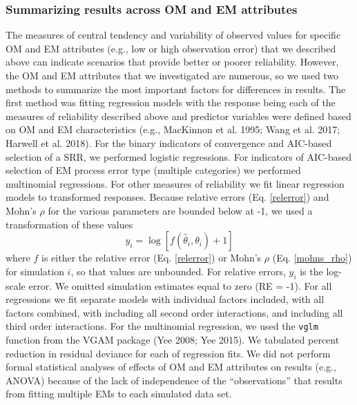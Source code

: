 \documentclass[
  12pt,
]{article}
\begin{document}
\subsubsection*{Summarizing results across OM and EM
attributes}\label{summarizing-results-across-om-and-em-attributes}

The measures of central tendency and variability of observed values for
specific OM and EM attributes (e.g., low or high observation error) that
we described above can indicate scenarios that provide better or poorer
reliability. However, the OM and EM attributes that we investigated are
numerous, so we used two methods to summarize the most important factors
for differences in results. The first method was fitting regression
models with the response being each of the measures of reliability
described above and predictor variables were defined based on OM and EM
characteristics (e.g., MacKinnon et al. 1995; Wang et al. 2017; Harwell
et al. 2018). For the binary indicators of convergence and AIC-based
selection of a SRR, we performed logistic regressions. For indicators of
AIC-based selection of EM process error type (multiple categories) we
performed multinomial regressions. For other measures of reliability we
fit linear regression models to transformed responses. Because relative
errors (Eq. \ref{relerror}) and Mohn's \(\rho\) for the various
parameters are bounded below at -1, we used a transformation of these
values \begin{equation}\label{bias_regression_response}
y_i = \log\left[f\left(\widehat \theta_i,\theta_i\right)+1\right]
\end{equation} where \(f\) is either the relative error (Eq.
\ref{relerror}) or Mohn's \(\rho\) (Eq. \ref{mohns_rho}) for simulation
\(i\), so that values are unbounded. For relative errors, \(y_i\) is the
log-scale error. We omitted simulation estimates equal to zero (RE =
-1). For all regressions we fit separate models with individual factors
included, with all factors combined, with including all second order
interactions, and including all third order interactions. For the
multinomial regression, we used the \verb|vglm| function from the VGAM
package (Yee 2008; Yee 2015). We tabulated percent reduction in residual
deviance for each of regression fits. We did not perform formal
statistical analyses of effects of OM and EM attributes on results
(e.g., ANOVA) because of the lack of independence of the
``observations'' that results from fitting multiple EMs to each
simulated data set.
\end{document}
